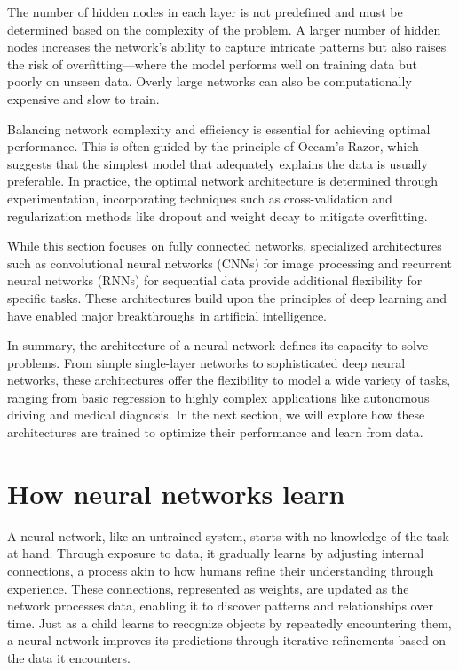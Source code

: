 \documentclass[
]{book}
\theoremstyle{definition}
\theoremstyle{definition}
\theoremstyle{definition}
\theoremstyle{definition}
\theoremstyle{remark}
\begin{document}
The number of hidden nodes in each layer is not predefined and must be determined based on the complexity of the problem. A larger number of hidden nodes increases the network's ability to capture intricate patterns but also raises the risk of overfitting---where the model performs well on training data but poorly on unseen data. Overly large networks can also be computationally expensive and slow to train.

Balancing network complexity and efficiency is essential for achieving optimal performance. This is often guided by the principle of Occam's Razor, which suggests that the simplest model that adequately explains the data is usually preferable. In practice, the optimal network architecture is determined through experimentation, incorporating techniques such as cross-validation and regularization methods like dropout and weight decay to mitigate overfitting.

While this section focuses on fully connected networks, specialized architectures such as convolutional neural networks (CNNs) for image processing and recurrent neural networks (RNNs) for sequential data provide additional flexibility for specific tasks. These architectures build upon the principles of deep learning and have enabled major breakthroughs in artificial intelligence.

In summary, the architecture of a neural network defines its capacity to solve problems. From simple single-layer networks to sophisticated deep neural networks, these architectures offer the flexibility to model a wide variety of tasks, ranging from basic regression to highly complex applications like autonomous driving and medical diagnosis. In the next section, we will explore how these architectures are trained to optimize their performance and learn from data.

\section{How neural networks learn}\label{how-neural-networks-learn}

A neural network, like an untrained system, starts with no knowledge of the task at hand. Through exposure to data, it gradually learns by adjusting internal connections, a process akin to how humans refine their understanding through experience. These connections, represented as weights, are updated as the network processes data, enabling it to discover patterns and relationships over time. Just as a child learns to recognize objects by repeatedly encountering them, a neural network improves its predictions through iterative refinements based on the data it encounters.
\end{document}
